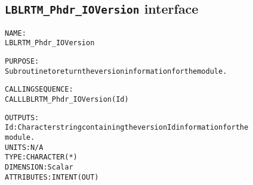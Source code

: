 \subsection{\texttt{LBLRTM\_Phdr\_IOVersion} interface}
  \label{sec:LBLRTM_Phdr_IOVersion_interface}
  \begin{alltt}
 
  NAME:
        LBLRTM_Phdr_IOVersion
 
  PURPOSE:
        Subroutine to return the version information for the module.
 
  CALLING SEQUENCE:
        CALL LBLRTM_Phdr_IOVersion( Id )
 
  OUTPUTS:
        Id:     Character string containing the version Id information for the
                module.
                UNITS:      N/A
                TYPE:       CHARACTER(*)
                DIMENSION:  Scalar
                ATTRIBUTES: INTENT(OUT)
 
  \end{alltt}
